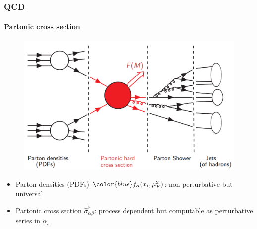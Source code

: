 \documentclass[aspectratio=43]{beamer}
\begin{document}
\begin{frame}
	
	\frametitle{QCD}
	\framesubtitle{Partonic cross section}
	
	\begin{figure}
		\includegraphics[width = 7 cm]{plots/factorization_2.png}
	\end{figure}
	
	\begin{itemize}
		\item Parton densities (PDFs) ${\color{blue} f_{\alpha}(x_{i}, \mu_{F}^{2})}$: non perturbative but universal
		\item Partonic cross section {\color{red}$\hat{\sigma}^{\textrm{F}}_{\alpha \beta}$}: process dependent but computable as perturbative series in $\alpha_{s}$
	\end{itemize}
	
\end{frame}
\end{document}
